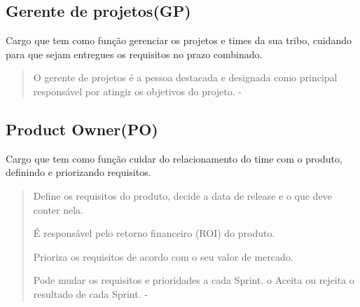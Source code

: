 \subsection{Gerente de projetos(GP)}

Cargo que tem como função gerenciar os projetos e times da sua
 tribo, cuidando para que sejam entregues os requisitos no prazo combinado.

\begin{quote}
  O gerente de projetos é a pessoa destacada e designada como principal responsável por atingir os objetivos do projeto. - \cite{cruz2013scrum}
\end{quote}
\subsection{Product Owner(PO)}
Cargo que tem como função cuidar do relacionamento do time com o produto,
 definindo e priorizando requisitos.
 
 \begin{quote}
  Define os requisitos do
  produto, decide a data de
  release e o que deve conter
  nela.

  É responsável pelo retorno
  financeiro (ROI) do produto.
  
  Prioriza os requisitos de
  acordo com o seu valor de
  mercado.
  
  Pode mudar os requisitos e
  prioridades a cada Sprint.
  o Aceita ou rejeita o resultado de
  cada Sprint. - \cite{sabbagh2014scrum}
 \end{quote}